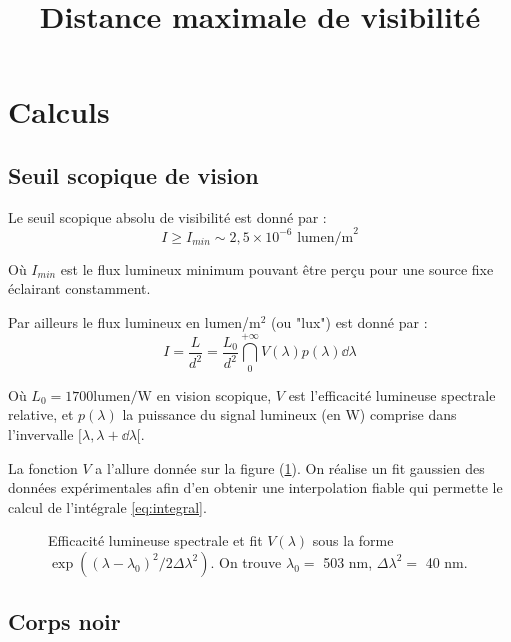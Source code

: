 \documentclass[11pt]{article} %
\title{Distance maximale de visibilité}
\author{}
\date{} %
\begin{document}
\maketitle

\section{Calculs}

\subsection{Seuil scopique de vision}

Le seuil scopique absolu de visibilité est donné par  :
\begin{equation}
I \geq I_{min} \sim 2,5 \times 10^{-6} \mbox{  lumen/m}^2
\end{equation}

Où $I_{min}$ est le flux lumineux minimum pouvant être perçu pour une source fixe éclairant constamment.

Par ailleurs le flux lumineux en lumen/m$^2$ (ou "lux") est donné par :
\begin{equation}
I = \dfrac{L}{d^2} = \dfrac{L_0}{d^2}  \dint_{0}^{+\infty} V(\lambda) p(\lambda) \dd \lambda
\label{eq:integral}
\end{equation}

Où $L_0 = 1700 \mbox{lumen/W}$ en vision scopique, $V$ est l'efficacité lumineuse spectrale relative, et $p(\lambda)$ la puissance du signal lumineux (en W) comprise dans l'invervalle $[\lambda, \lambda+\dd\lambda[$.

La fonction $V$ a l'allure donnée sur la figure (\ref{fig:efficacite_spectrale}). On réalise un fit gaussien des données expérimentales afin d'en obtenir une interpolation fiable qui permette le calcul de l'intégrale \eqref{eq:integral}.

\begin{figure}[H]
\centering
  \caption{Efficacité lumineuse spectrale et fit $V(\lambda)$ sous la forme $\exp \left ( (\lambda-\lambda_0)^2/2\Delta\lambda^2\right )$. On trouve $\lambda_0 = $ 503 nm, $\Delta \lambda^2 =$ 40 nm.
\label{fig:efficacite_spectrale}}

\end{figure}

\subsection{Corps noir}
\end{document}
